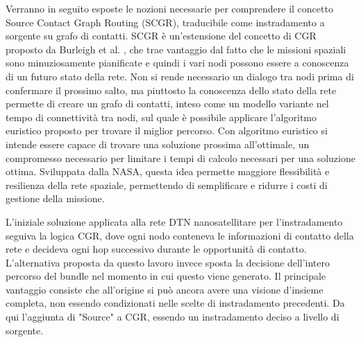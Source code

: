 \documentclass[12pt,a4paper,oneside]{book}
\begin{document}
		Verranno in seguito esposte le nozioni necessarie per comprendere il concetto Source Contact Graph Routing (SCGR), traducibile come instradamento a sorgente su grafo di contatti. SCGR è un'estensione del concetto di CGR proposto da Burleigh et al. \cite{burleigh2010contact}, che trae vantaggio dal fatto che le missioni spaziali sono minuziosamente pianificate e quindi i vari nodi possono essere a conoscenza di un futuro stato della rete. Non si rende necessario un dialogo tra nodi prima di confermare il prossimo salto, ma piuttosto la conoscenza dello stato della rete permette di creare un grafo di contatti, inteso come un modello variante nel tempo di connettività tra nodi, sul quale è possibile applicare l'algoritmo euristico proposto per trovare il miglior percorso. Con algoritmo euristico si intende essere capace di trovare una soluzione prossima all'ottimale, un compromesso necessario per limitare i tempi di calcolo necessari per una soluzione ottima. Sviluppata dalla NASA, questa idea permette maggiore flessibilità e resilienza della rete spaziale, permettendo di semplificare e ridurre i costi di gestione della missione.
		
		L'iniziale soluzione applicata alla rete DTN nanosatellitare per l'instradamento seguiva la logica CGR, dove ogni nodo conteneva le informazioni di contatto della rete e decideva ogni hop successivo durante le opportunità di contatto. L'alternativa proposta da questo lavoro invece sposta la decisione dell'intero percorso del bundle nel momento in cui questo viene generato. Il principale vantaggio consiste che all'origine si può ancora avere una visione d'insieme completa, non essendo condizionati nelle scelte di instradamento precedenti. Da qui l'aggiunta di "Source" a CGR, essendo un instradamento deciso a livello di sorgente. 
		
\end{document}

